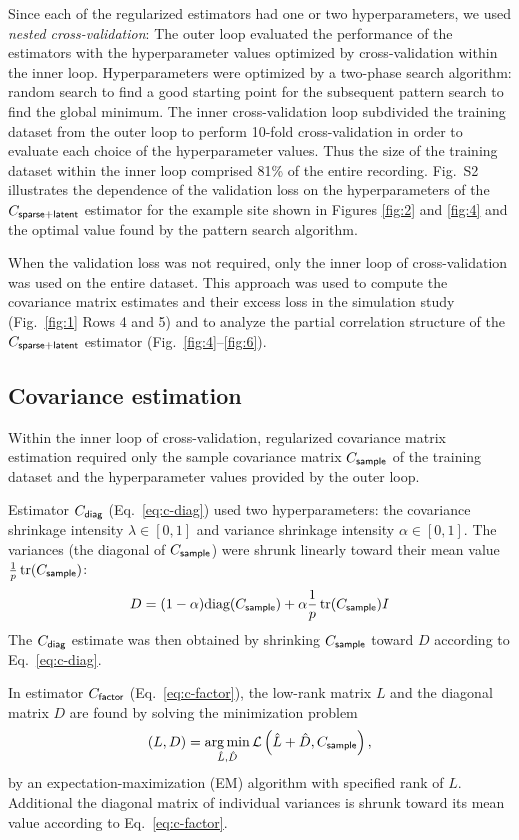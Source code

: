 Since each of the regularized estimators had one or two hyperparameters, we used \emph{nested cross-validation}:  The outer loop evaluated the performance of the estimators with the hyperparameter values optimized by cross-validation within the inner loop.  Hyperparameters were optimized by a two-phase search algorithm: random search to find a good starting point for the subsequent pattern search to find the global minimum.  The inner cross-validation loop subdivided the training dataset from the outer loop to perform 10-fold cross-validation in order to evaluate each choice of the hyperparameter values.  Thus the size of the training dataset within the inner loop comprised 81\% of the entire recording. Fig.~S2 illustrates the dependence of the validation loss on the hyperparameters of the $C_{\sf sparse+latent}$ estimator for the example site shown in Figures \ref{fig:2} and \ref{fig:4} and the optimal value found by the pattern search algorithm.

When the validation loss was not required, only the inner loop of cross-validation was used on the entire dataset.  This approach was used to compute the covariance matrix estimates and their excess loss in the simulation study (Fig.~\ref{fig:1} Rows 4 and 5) and to analyze the partial correlation structure of the $C_{\sf sparse+latent}$ estimator (Fig.~\ref{fig:4}--\ref{fig:6}).

\subsection*{Covariance estimation}
Within the inner loop of cross-validation, regularized covariance matrix estimation required only the sample covariance matrix $C_{\sf sample}$ of the training dataset and the hyperparameter values provided by the outer loop.

Estimator $C_{\sf diag}$ (Eq.~\ref{eq:c-diag})  used two hyperparameters: the covariance shrinkage intensity $\lambda \in [0,1]$ and variance shrinkage intensity $\alpha \in [0,1]$.  The variances (the diagonal of $C_{\sf sample}$) were shrunk linearly toward their mean value $\frac 1 p \operatorname{tr}(C_{\sf sample})$:
\begin{equation}
D = (1-\alpha)\mbox{diag}(C_{\sf sample}) + \alpha \frac 1 p \operatorname{tr}(C_{\sf sample}) I
\end{equation}
The $C_{\sf diag}$ estimate was then obtained by shrinking $C_{\sf sample}$ toward $D$ according to Eq.~\ref{eq:c-diag}.

In estimator $C_{\sf factor}$ (Eq.~\ref{eq:c-factor}), the low-rank matrix $L$ and the diagonal matrix $D$ are found by solving the minimization problem
\begin{equation}
(L,D) = \operatorname*{arg\,min}\limits_{\hat L,\hat D} \mathcal L\left(\hat L + \hat D,C_{\sf sample}\right),
\end{equation}
by an expectation-maximization (EM) algorithm with specified rank of $L$. Additional the diagonal matrix of individual variances is shrunk toward its mean value according to Eq.~\ref{eq:c-factor}.

